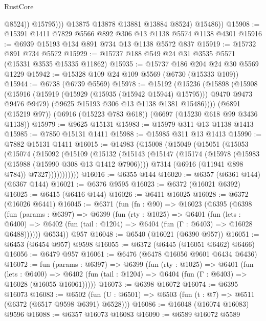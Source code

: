 \begin{lexlean}{RustCore}
\begin{coremodule}
                    @8524))
                @15795)))
          @13875
          @13878
          @13881
          @13884
          @8524)
        @15486))
@15908 := @15391 @1411 @7829 @5566 @892 @306 @13 @1138 @5574 @1138 @4301
@15916 := @6939 @15193 @134 @891 @734 @13 @1138 @5572 @837
@15919 := @15732 @891 @734 @5572
@15929 := @15737 @188 @549 @24 @31 @3535 @5571 (@15331 @3535 @15335 @11862)
@15935 := @15737 @186 @204 @24 @30 @5569 @1229
@15942 := @15328 @109 @24 @109 @5569 (@6730 (@15333 @109))
@15944 := @6738 (@6739 @5569)
@15978 := @15192
    (@15236
      (@15898
        (@15908
          (@15916 (@15919 (@15929 (@15935 (@15942 @15944) @15795))) @9470 @9473 @9476 @9479)
          (@9625 @15193 @306 @13 @1138 @1381 @15486))))
    (@6891 (@15219 @97))
    (@6916 (@15223 @783 @618))
    (@6697 (@15230 @618 @99 @3436 @1138))
@15979 := @9625 @15131
@15983 := @15979 @311 @13 @1138 @1413
@15985 := @7850 @15131 @1411
@15988 := @15985 @311 @13 @1413
@15990 := @7882 @15131 @1411
@16015 := @14983
    (@15008
      (@15049
        (@15051
          (@15053
            (@15074
              (@15092
                (@15109
                  (@15132
                    (@15143
                      (@15147
                        (@15174
                          (@15978 (@15983 (@15988 (@15990 @308 @13 @1412 @7906))))
                          @7314
                          (@6916 (@11941 @898 @784))
                          @7327)))))))))))
@16016 := @6355 @144
@16020 := @6357 (@6361 @144) (@6367 @144)
@16021 := @6376 @9595
@16023 := @6372 (@16021 @6392)
@16025 := @6415 (@6416 @144)
@16026 := @6411 @16025
@16028 := @6372 (@16026 @6441)
@16045 := @6371
    (fun (fn : @90) =>
    @16023
      (@6395
        (@6398
          (fun (params : @6397) =>
          @6399
            (fun (rty : @1025) =>
            @6401
              (fun (lets : @6400) =>
              @6402 (fun (tail : @1204) => @6404 (fun (Γ : @6403) => @16028 @6488))))))
        @6534))
    @957
@16048 := @6540 (@16021 (@6390 @957))
@16051 := @6453 (@6454 @957) @9598
@16055 := @6372 (@6445 (@16051 @6462) @6466)
@16056 := @6479 @957
@16061 := @6476 (@6478 @16056 @9601 @6434 @6436)
@16072 := fun (params : @6397) =>
  @6399
    (fun (rty : @1025) =>
    @6401
      (fun (lets : @6400) =>
      @6402 (fun (tail : @1204) => @6404 (fun (Γ : @6403) => @16028 (@16055 @16061)))))
@16073 := @6398 @16072
@16074 := @6395 @16073
@16083 := @6502 (fun (U : @6501) => @6503 (fun (t : @7) => @6511 (@6372 (@6517 @9598 @6391) @6528)))
@16086 := @16048 (@16074 @16083) @9596
@16088 := @6357 @16073 @16083
@16090 := @6589 @16072 @5589

\end{coremodule}
\end{lexlean}
